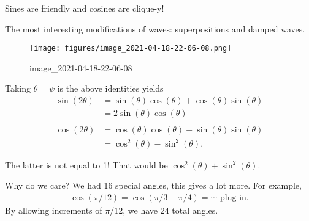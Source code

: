 \begin{slogan}

Sines are friendly and cosines are clique-y!

\end{slogan}

\begin{remark}

The most interesting modifications of waves: superpositions and damped
waves.

\begin{figure}
\centering
\texttt{[image: figures/image\_2021-04-18-22-06-08.png]}
\caption{image\_2021-04-18-22-06-08}
\end{figure}

\end{remark}

\begin{corollary}

Taking \(\theta = \psi\) is the above identities yields
\begin{align*}
\sin(2\theta ) 
&= \sin(\theta) \cos(\theta) + \cos(\theta) \sin(\theta) \\
&= 2\sin(\theta)\cos(\theta) \\ \\
\cos(2\theta) 
&= \cos(\theta) \cos(\theta) + \sin(\theta) \sin(\theta) \\
&= \cos^2(\theta) - \sin^2(\theta) 
.\end{align*}

\end{corollary}

\begin{warnings}

The latter is not equal to 1! That would be
\(\cos^2(\theta) + \sin^2(\theta)\).

\end{warnings}

\begin{remark}

Why do we care? We had 16 special angles, this gives a lot more. For
example,
\begin{align*}
\cos(\pi/12)
=
\cos(\pi/3 - \pi/4) = \cdots \text{ plug in}
.\end{align*}
By allowing increments of \(\pi/12\), we have 24 total angles.

\end{remark}

